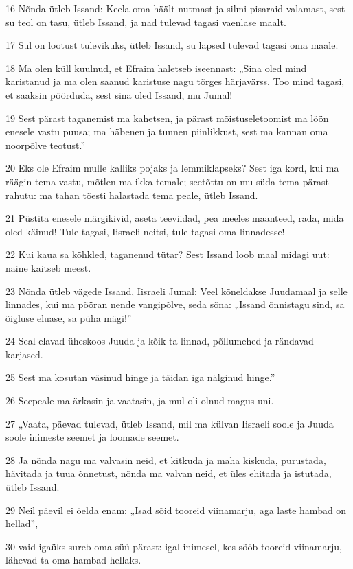 \par 16 Nõnda ütleb Issand: Keela oma häält nutmast ja silmi pisaraid valamast, sest su teol on tasu, ütleb Issand, ja nad tulevad tagasi vaenlase maalt.
\par 17 Sul on lootust tulevikuks, ütleb Issand, su lapsed tulevad tagasi oma maale.
\par 18 Ma olen küll kuulnud, et Efraim haletseb iseennast: „Sina oled mind karistanud ja ma olen saanud karistuse nagu tõrges härjavärss. Too mind tagasi, et saaksin pöörduda, sest sina oled Issand, mu Jumal!
\par 19 Sest pärast taganemist ma kahetsen, ja pärast mõistuseletoomist ma löön enesele vastu puusa; ma häbenen ja tunnen piinlikkust, sest ma kannan oma noorpõlve teotust.”
\par 20 Eks ole Efraim mulle kalliks pojaks ja lemmiklapseks? Sest iga kord, kui ma räägin tema vastu, mõtlen ma ikka temale; seetõttu on mu süda tema pärast rahutu: ma tahan tõesti halastada tema peale, ütleb Issand.
\par 21 Püstita enesele märgikivid, aseta teeviidad, pea meeles maanteed, rada, mida oled käinud! Tule tagasi, Iisraeli neitsi, tule tagasi oma linnadesse!
\par 22 Kui kaua sa kõhkled, taganenud tütar? Sest Issand loob maal midagi uut: naine kaitseb meest.
\par 23 Nõnda ütleb vägede Issand, Iisraeli Jumal: Veel kõneldakse Juudamaal ja selle linnades, kui ma pööran nende vangipõlve, seda sõna: „Issand õnnistagu sind, sa õigluse eluase, sa püha mägi!”
\par 24 Seal elavad üheskoos Juuda ja kõik ta linnad, põllumehed ja rändavad karjased.
\par 25 Sest ma kosutan väsinud hinge ja täidan iga nälginud hinge.”
\par 26 Seepeale ma ärkasin ja vaatasin, ja mul oli olnud magus uni.
\par 27 „Vaata, päevad tulevad, ütleb Issand, mil ma külvan Iisraeli soole ja Juuda soole inimeste seemet ja loomade seemet.
\par 28 Ja nõnda nagu ma valvasin neid, et kitkuda ja maha kiskuda, purustada, hävitada ja tuua õnnetust, nõnda ma valvan neid, et üles ehitada ja istutada, ütleb Issand.
\par 29 Neil päevil ei öelda enam: „Isad sõid tooreid viinamarju, aga laste hambad on hellad”,
\par 30 vaid igaüks sureb oma süü pärast: igal inimesel, kes sööb tooreid viinamarju, lähevad ta oma hambad hellaks.
